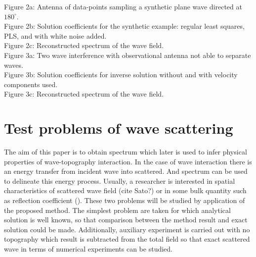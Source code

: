 Figure 2a: Antenna of data-points sampling a synthetic plane wave directed at $180^{\circ}$.\\
Figure 2b: Solution coefficients for the synthetic example: regular least squares, PLS, and with 
white noise added.\\
Figure 2c: Reconstructed spectrum of the wave field.\\

Figure 3a: Two wave interference with observational antenna not able to separate waves.\\
Figure 3b: Solution coefficients for inverse solution without and with velocity components used.\\
Figure 3c: Reconstructed spectrum of the wave field.\\

\section{Test problems of wave scattering}
The aim of this paper is to obtain spectrum which later is used to infer physical properties of 
wave-topography interaction. In the case of wave interaction there is an energy transfer from 
incident wave into scattered. And spectrum can be used to delineate this energy process. Usually, a 
researcher is interested in spatial characteristics of scattered wave field (cite Sato?) or in some 
bulk quantity such as reflection coefficient (\cite{klymak2016reflection}). These two problems will 
be studied by application of the proposed method. The simplest problem are taken for which 
analytical solution is well known, so that comparison between the method result and exact solution 
could be made. Additionally, auxiliary experiment is carried out with no topography which result is 
subtracted from the total field so that exact scattered wave in terms of numerical experiments can 
be studied.

